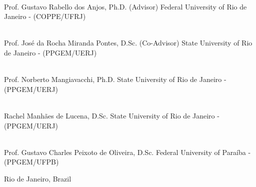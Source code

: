 \begin{flushright}
\parbox{12cm}{

\singlespacing

\hrulefill \\

\vspace{-.4cm}
Prof. Gustavo Rabello dos Anjos, Ph.D. (Advisor)
\newline
Federal University of Rio de Janeiro - (COPPE/UFRJ)
\vspace{.7cm}

\hrulefill \\

\vspace{-.4cm}
Prof. José da Rocha Miranda Pontes, D.Sc. (Co-Advisor)
\newline
State University of Rio de Janeiro - (PPGEM/UERJ)
\vspace{.7cm}

\hrulefill \\

\vspace{-.4cm}
Prof. Norberto Mangiavacchi, Ph.D.
\newline
State University of Rio de Janeiro - (PPGEM/UERJ)
\vspace{.7cm}

\hrulefill \\

\vspace{-.4cm}
Rachel Manhães de Lucena, D.Sc.
\newline
State University of Rio de Janeiro - (PPGEM/UERJ)
\vspace{.7cm}

\hrulefill \\

\vspace{-.4cm}
Prof. Gustavo Charles Peixoto de Oliveira, D.Sc.
\newline
Federal University of Paraíba - (PPGEM/UFPB)
\vspace{.7cm}

}
\end{flushright}
\vfill

\begin{center}
Rio de Janeiro, Brazil
\end{center}

